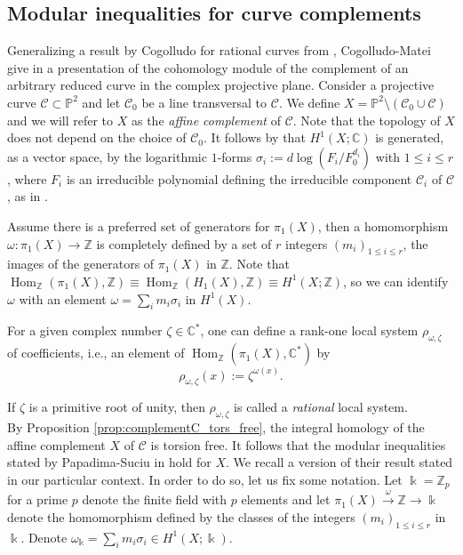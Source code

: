 \documentclass[11pt]{amsart}
\DeclareMathOperator{\Hom}{Hom}
\def\cC{\mathcal{C}}
\def\ZZ{\mathbb{Z}}
\def\CC{\mathbb{C}}
\def\PP{\mathbb{P}}
\def\kk{\Bbbk}
\def\w{\omega}
\theoremstyle{plain}
\theoremstyle{definition}
\begin{document}
\subsection{Modular inequalities for curve complements}
Generalizing a result by Cogolludo for rational curves from \cite{C}, Cogolludo-Matei give in \cite{CM} a presentation of the cohomology module of  the complement of an arbitrary reduced curve in the complex projective plane. Consider a projective curve $\cC\subset\PP^2$ and let $\cC_0$ be a line transversal to $\cC$. 
We define $X=\PP^2\setminus (\cC_0\cup\cC)$ and we will refer to $X$ as the \emph{affine complement} of $\cC$. Note that the topology of $X$ does not depend on the choice of $\cC_0$.
It follows by \cite[Theorem 3.1]{CM} that $H^1(X;\CC)$ is generated, as a vector space, 
by the logarithmic $1$-forms $\sigma_i:=d\log\left({F_i} / {F_0^{d_i}}\right)$ with $1 \leq i \leq r$, where $F_i$ is an irreducible polynomial defining the irreducible component $\cC_i$ of $\mathcal{C}$, as in \cite[Section 3]{CM}. 

Assume there is a preferred set of generators for $\pi_1(X)$, then a homomorphism $\omega : \pi_1(X) \rightarrow \mathbb{Z}$ is completely  defined by a set of $r$ integers $(m_i)_{1 \leq i \leq r}$, the images of the generators of $ \pi_1(X)$ in $\mathbb{Z}$. Note that $\Hom_{\mathbb{Z}}(\pi_1(X), \mathbb{Z}) \equiv \Hom_{\mathbb{Z}}(H_1(X), \mathbb{Z})  \equiv H^1(X;\ZZ)$, so we can identify $\omega$ with an element  $\w=\sum_i m_i \sigma_i$ in $H^1(X)$.

For a given complex number $\zeta \in \mathbb{C}^*$, one can define a rank-one local system $\rho_{\omega, \zeta}$ of coefficients, i.e., an element of $\Hom_{\mathbb{Z}}(\pi_1(X), \mathbb{C}^*)$ by 
$$\rho_{\omega, \zeta}(x):=\zeta^{\omega(x)}.$$

If $\zeta$ is a primitive root of unity, then $\rho_{\omega, \zeta}$ is called a {\it rational} local system.\\

By Proposition \ref{prop:complementC_tors_free}, the integral homology of the affine complement $X$ of $\cC$ is torsion free. 
It follows that the modular inequalities stated by Papadima-Suciu in \cite[Theorem C]{PS2} hold for $X$. 
We recall a version of their result stated in our particular context. 
In order to do so, let us fix some notation.
Let $\kk=\ZZ_p$ for a prime $p$ denote the finite field with $p$ elements and let $\pi_1(X) \overset{\omega }{\longrightarrow} \mathbb{Z}\to \kk$ denote the homomorphism defined by the classes of the integers $(m_i)_{1 \leq i \leq r}$ in $\kk$. Denote 
$\omega_{\kk} = \sum_i m_i \sigma_i \in H^1(X;\kk)$.
\end{document}
